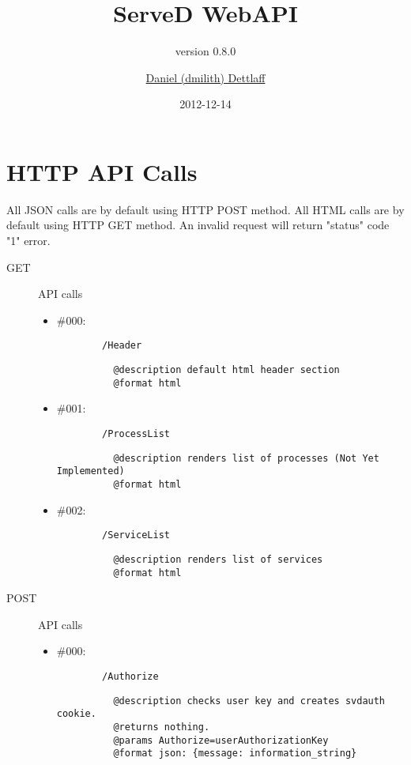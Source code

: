 \documentclass[11pt,a4paper]{scrartcl}
\title{ServeD WebAPI}
\author{\href{mailto:dmilith@verknowsys.com}{Daniel (dmilith) Dettlaff}}
\subtitle{version 0.8.0}
\date{2012-12-14}
\begin{document}
\maketitle

\section{HTTP API Calls}\label{sec:apicalls}
  All JSON calls are by default using HTTP POST method.
  All HTML calls are by default using HTTP GET method.
  An invalid request will return "status" code "1" error.

\begin{description}


    \item[GET] API calls

      \begin{itemize}
        \item \#000:
          \begin{verbatim}
        /Header
          \end{verbatim}
          \begin{verbatim}
          @description default html header section
          @format html
          \end{verbatim}

        \item \#001:
          \begin{verbatim}
        /ProcessList
          \end{verbatim}
          \begin{verbatim}
          @description renders list of processes (Not Yet Implemented)
          @format html
          \end{verbatim}

        \item \#002:
          \begin{verbatim}
        /ServiceList
          \end{verbatim}
          \begin{verbatim}
          @description renders list of services
          @format html
          \end{verbatim}
      \end{itemize}




    \item[POST] API calls
      \begin{itemize}

        \item \#000:
          \begin{verbatim}
        /Authorize
          \end{verbatim}
          \begin{verbatim}
          @description checks user key and creates svdauth cookie.
          @returns nothing.
          @params Authorize=userAuthorizationKey
          @format json: {message: information_string}
          \end{verbatim}


\end{itemize}
\end{description}
\end{document}
